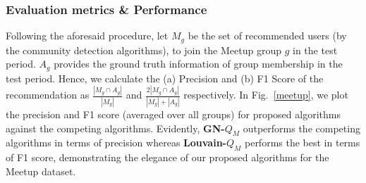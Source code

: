 \subsubsection{Evaluation metrics \& Performance}
 Following the aforesaid procedure, let $M_g$ be the set of recommended users (by the community detection algorithms),
 to join the Meetup group $g$ in the test period. ${A}_g$ provides the ground truth information of group membership in the test 
 period. Hence, we calculate the (a) Precision and (b) F1 Score of the recommendation
 as $\frac{\left\vert M_g \cap A_g \right\vert}{\left\vert M_g \right\vert}$ and
 $\frac{2 \left\vert M_g \cap A_g \right\vert}{\left\vert M_g \right\vert + \left\vert A_g \right\vert}$
 respectively.
%
In Fig.~\ref{meetup}, we plot the precision and F1 score (averaged over all groups) for proposed algorithms against the competing algorithms.
Evidently, \textbf{GN-$Q_M$} outperforms the competing algorithms in terms of precision whereas \textbf{Louvain-$Q_M$} performs the best
in terms of F1
score, demonstrating the elegance of our proposed algorithms for the Meetup dataset.

